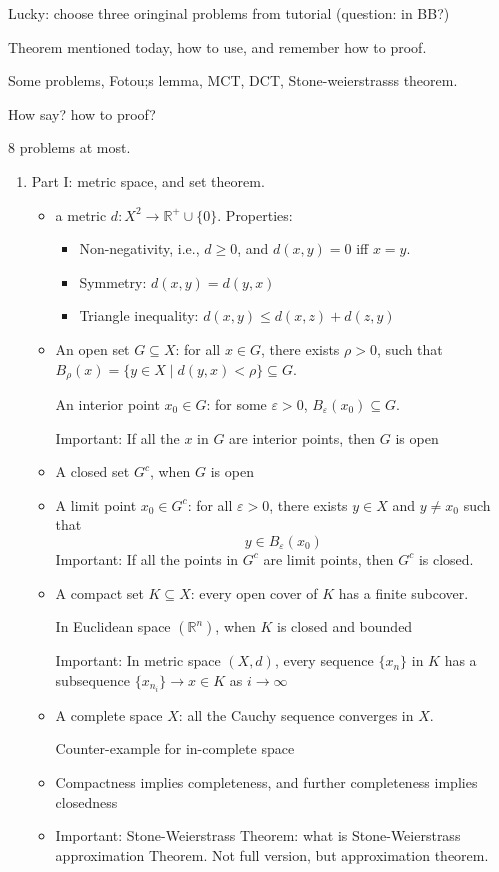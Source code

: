 Lucky: choose three oringinal problems from tutorial (question: in BB?)

Theorem mentioned today, how to use, and remember how to proof.

Some problems, Fotou;s lemma, MCT, DCT, Stone-weierstrasss theorem.

How say? how to proof?

8 problems at most.

\begin{enumerate}
\item
Part I: metric space, and set theorem.
\begin{itemize}
\item
a metric $d:X^2\to\mathbb{R}^+\cup\{0\}$.
Properties:
\begin{itemize}
\item
Non-negativity, i.e., $d\ge0$, and $d(x,y)=0$ iff $x=y$.
\item
Symmetry: $d(x,y)=d(y,x)$
\item
Triangle inequality: $d(x,y)\le d(x,z)+d(z,y)$ 
\end{itemize}
\item
An open set $G\subseteq X$: for all $x\in G$, there exists $\rho>0$, such that $B_{\rho}(x)=\{y\in X\mid d(y,x)<\rho\}\subseteq G$.

An interior point $x_0\in G$: for some $\varepsilon>0$, $B_{\varepsilon}(x_0)\subseteq G$.

Important: If all the $x$ in $G$ are interior points, then $G$ is open
\item
A closed set $G^c$, when $G$ is open
\item
A limit point $x_0\in G^c$: for all $\varepsilon>0$, there exists $y\in X$ and $y\ne x_0$ such that
\[
y\in B_{\varepsilon}(x_0)
\]
Important: If all the points in $G^c$ are limit points, then $G^c$ is closed.
\item
A compact set $K\subseteq X$:
every open cover of $K$ has a finite subcover.

In Euclidean space $(\mathbb{R}^n)$, when $K$ is closed and bounded

Important: In metric space $(X,d)$, every sequence $\{x_n\}$ in $K$ has a subsequence $\{x_{n_i}\}\to x\in K$ as $i\to\infty$
\item
A complete space $X$:
all the Cauchy sequence converges in $X$.

Counter-example for in-complete space
\item
Compactness implies completeness, and further completeness implies closedness
\item
Important: Stone-Weierstrass Theorem: 
what is Stone-Weierstrass approximation Theorem.
Not full version, but approximation theorem.


\end{itemize}
\end{enumerate}
